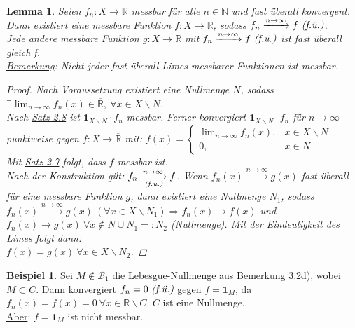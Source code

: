 \documentclass[a4paper]{scrreprt}
\newcommand{\doubleOne}{\textbf{1}}
\newcommand{\R}{\mathbb{R}}
\newcommand{\Rq}{\overline{\R}}
\newcommand{\N}{\mathbb{N}}
\newcommand{\Borel}{\mathcal{B}}
\newcommand{\toInf}{\rightarrow \infty}
\newcommand{\limToInf}[1]{\lim_{#1 \toInf}}
\newcommand{\jlabel}[1]{\label{j_#1}}
\newcommand{\jhyperref}[2]{\hyperref[j_#1]{#2}}
\newcommand{\jlink}[1]{\jhyperref{#1}{#1}}
\newcommand{\fu}{\text{\textit{(f.ü.)}}}
\newcommand{\jabb}[3]{ #1: #2 \rightarrow #3 }
\theoremstyle{plain}
\newtheorem{lem}[thm]{Lemma}
\theoremstyle{definition}
\newtheorem*{expl*}{Beispiel}
\begin{document}
{{{{\begin{lem}
\jlabel{Lem 3.7}
    Seien $\jabb{f_n}{X}{\Rq}$ messbar für alle $n\in\N$ und fast überall konvergent. Dann existiert eine messbare Funktion $\jabb{f}{X}{\Rq}$, sodass $f_n\xrightarrow{n\rightarrow\infty} f \ \fu$.\\
    Jede andere messbare Funktion $\jabb{g}{X}{\Rq}$ mit $f_n \xrightarrow{n\rightarrow \infty} f \ \fu$ ist fast überall gleich f.\\
    \uline{Bemerkung}: Nicht jeder fast überall Limes messbarer Funktionen ist messbar.
    \begin{proof}
        Nach Voraussetzung existiert eine Nullmenge $N$, sodass\\
        $\exists \limToInf{n} f_n(x)\in\Rq, \ \forall x\in X\backslash N$.\\
        Nach \jlink{Satz 2.8} ist $\doubleOne_{X\backslash N} \cdot f_n$ messbar. Ferner konvergiert $\doubleOne_{X\backslash N}\cdot f_n$ für $n \rightarrow \infty$ punktweise gegen $\jabb{f}{X}{\Rq}$ mit: $f(x) = \begin{cases} \limToInf{n} f_n(x), & x\in X\backslash N\\ 0, & x\in N \end{cases}$\\
        Mit \jlink{Satz 2.7} folgt, dass $f$ messbar ist.\\
        Nach der Konstruktion gilt: $f_n \underset{\fu}{\xrightarrow{n \rightarrow \infty}} f$. Wenn $f_n(x) \xrightarrow{n\rightarrow \infty} g(x)$ fast überall für eine messbare Funktion $g$, dann existiert eine Nullmenge $N_1$, sodass $f_n(x) \xrightarrow{n\rightarrow \infty} g(x) \ (\forall x\in X\backslash N_1) \Rightarrow f_n(x) \rightarrow f(x)$ und $f_n(x) \rightarrow g(x) \ \forall x\notin N\cup N_1 =: N_2$ (Nullmenge). Mit der Eindeutigkeit des Limes folgt dann:\\
        $f(x) = g(x) \ \forall x\in X\backslash N_2$.
    \end{proof}
\end{lem}

\begin{expl*}
    Sei $M\notin \Borel_1$ die Lebesgue-Nullmenge aus Bemerkung 3.2d), wobei $M\subset C$. Dann konvergiert $f_n=0 \ \fu$ gegen $f = \doubleOne_M$, da $f_n(x) = f(x) = 0 \ \forall x \in \R\backslash C$. $C$ ist eine Nullmenge.\\
    \uline{Aber}: $f= \doubleOne_M$ ist nicht messbar.
\end{expl*}

}}}}
\end{document}
